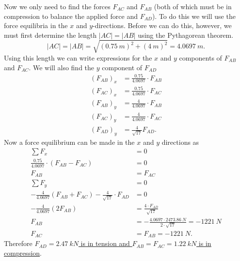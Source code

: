 \documentclass[a4paper]{article}
\theoremstyle{definition}
\begin{document}
Now we only need to find the forces $F_{AC}$ and $F_{AB}$ (both of which must be in compression to balance the applied force and $F_{AD}$). To do this we will use the force equilibria in the $x$ and $y$-directions. Before we can do this, however, we must first determine the length $\left| AC \right| = \left| AB \right|$ using the Pythagorean theorem. 
\[ 
\left| AC \right| = \left| AB \right| = \sqrt{\left( \qty{0,75}{m}  \right)^2 + \left( \qty{4}{m}  \right)^2} =  \qty{4,0697}{m}  
.\]
Using this length we can write expressions for the $x$ and $y$ components of $F_{AB}$ and $F_{AC}$. We will also find the $y$ component of $F_{AD}$
\begin{align*}
  \left( F_{AB} \right)_x &= \frac{\num{0,75} }{\num{4,0697}} \cdot F_{AB} \\
  \left( F_{AC} \right)_x &= \frac{\num{0,75}}{\num{4,0697} } \cdot F_{AC} \\
  \left( F_{AB} \right)_y &= \frac{4}{\num{4,0697} } \cdot F_{AB} \\
  \left( F_{AC} \right)_y &= \frac{4}{\num{4,0697}} \cdot F_{AC} \\
  \left( F_{AD} \right)_y &= \frac{4}{\sqrt{17}} F_{AD}
.\end{align*}
Now a force equilibrium can be made in the $x$ and $y$ directions as
\begin{align*}
  \sum F_x &= 0 \\
  \frac{\num{0,75} }{\num{4,0697} } \cdot (F_{AB} - F_{AC} ) &= 0 \\
  F_{AB} &= F_{AC} \\
  \sum F_y &= 0 \\
  - \frac{4}{\num{4,0697} } \left( F_{AB} + F_{AC} \right) - \frac{4}{\sqrt{17}} \cdot F_{AD} &= 0 \\
  - \frac{4}{\num{4,0697} } \left( 2 F_{AB} \right) &= \frac{4 \cdot F_{AD}}{\sqrt{17}} \\
  F_{AB} &= -\frac{\num{4,0697}  \cdot \qty{2473,86}{N}}{2 \cdot \sqrt{17}} = \qty{-1221}{N} \\
  F_{AC} &= F_{AB} = \qty{-1221}{N} 
.\end{align*}
Therefore \underline{\underline{$F_{AD} = \qty{2,47}{kN}$ is in tension and $F_{AB} = F_{AC} = \qty{1,22}{kN}$ is in compression}}.
\end{document}
